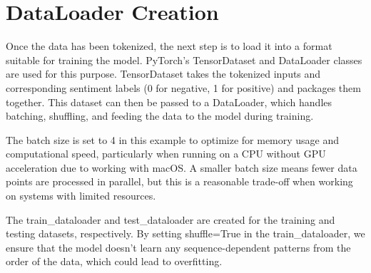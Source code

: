 \documentclass[11pt]{article}
\begin{document}
    \section{DataLoader Creation}\label{dataloader-creation}

    Once the data has been tokenized, the next step is to load it into a
format suitable for training the model. PyTorch's TensorDataset and
DataLoader classes are used for this purpose. TensorDataset takes the
tokenized inputs and corresponding sentiment labels (0 for negative, 1
for positive) and packages them together. This dataset can then be
passed to a DataLoader, which handles batching, shuffling, and feeding
the data to the model during training.

The batch size is set to 4 in this example to optimize for memory usage
and computational speed, particularly when running on a CPU without GPU
acceleration due to working with macOS. A smaller batch size means fewer
data points are processed in parallel, but this is a reasonable
trade-off when working on systems with limited resources.

The train\_dataloader and test\_dataloader are created for the training
and testing datasets, respectively. By setting shuffle=True in the
train\_dataloader, we ensure that the model doesn't learn any
sequence-dependent patterns from the order of the data, which could lead
to overfitting.
\end{document}
